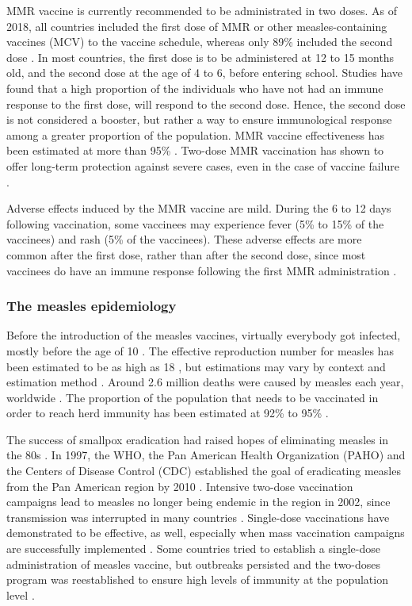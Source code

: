 MMR vaccine is currently recommended to be administrated in two doses. As of 2018, all countries included the first dose of MMR or other measles-containing vaccines (MCV) to the vaccine schedule, whereas only 89\% included the second dose \cite[]{Peck2018}. In most countries, the first dose is to be administered at 12 to 15 months old, and the second dose at the age of 4 to 6, before entering school. Studies have found that a high proportion of the individuals who have not had an immune response to the first dose, will respond to the second dose. Hence, the second dose is not considered a booster, but rather a way to ensure immunological response among a greater proportion of the population. MMR vaccine effectiveness has been estimated at more than 95\% \cite[]{Strebel2013}. Two-dose MMR vaccination has shown to offer long-term protection against severe cases, even in the case of vaccine failure \cite[]{Bonneton2020}.

Adverse effects induced by the MMR vaccine are mild. During the 6 to 12 days following vaccination, some vaccinees may experience fever (5\% to 15\% of the vaccinees) and rash (5\% of the vaccinees). These adverse effects are more common after the first dose, rather than after the second dose, since most vaccinees do have an immune response following the first MMR administration \cite[]{Strebel2013}.

\subsubsection{The measles epidemiology}
\label{sec:MeaslesEpi}

Before the introduction of the measles vaccines, virtually everybody got infected, mostly before the age of 10 \cite[]{Strebel2013}. The effective reproduction number for measles has been estimated to be as high as 18 \cite[]{Anderson1992}, but estimations may vary by context and estimation method \cite[]{Guerra2017}. Around 2.6 million deaths were caused by measles each year, worldwide \cite[]{WHO_Factsheet_Measles}. The proportion of the population that needs to be vaccinated in order to reach herd immunity has been estimated at 92\% to 95\% \cite[]{Strebel2013}. 

The success of smallpox eradication had raised hopes of eliminating measles in the 80s \cite[]{Hopkins1982}. In 1997, the WHO, the Pan American Health Organization (PAHO) and the Centers of Disease Control (CDC) established the goal of eradicating measles from the Pan American region by 2010 \cite[]{MMWR_MeaslesErradication1997}. Intensive two-dose vaccination campaigns lead to measles no longer being endemic in the region in 2002, since transmission was interrupted in many countries \cite[]{Sever2011,DeQuadros2004}. 
%
Single-dose vaccinations have demonstrated to be effective, as well, especially when mass vaccination campaigns are successfully implemented \cite[]{Sever2011}. Some countries tried to establish a single-dose administration of measles vaccine, but outbreaks persisted and the two-doses program was reestablished to ensure high levels of immunity at the population level \cite[]{Strebel2013}.  

